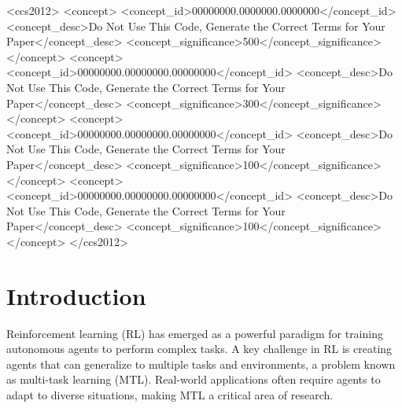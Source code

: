 \documentclass[sigconf]{acmart}
\begin{document}
\begin{CCSXML}
<ccs2012>
 <concept>
  <concept_id>00000000.0000000.0000000</concept_id>
  <concept_desc>Do Not Use This Code, Generate the Correct Terms for Your Paper</concept_desc>
  <concept_significance>500</concept_significance>
 </concept>
 <concept>
  <concept_id>00000000.00000000.00000000</concept_id>
  <concept_desc>Do Not Use This Code, Generate the Correct Terms for Your Paper</concept_desc>
  <concept_significance>300</concept_significance>
 </concept>
 <concept>
  <concept_id>00000000.00000000.00000000</concept_id>
  <concept_desc>Do Not Use This Code, Generate the Correct Terms for Your Paper</concept_desc>
  <concept_significance>100</concept_significance>
 </concept>
 <concept>
  <concept_id>00000000.00000000.00000000</concept_id>
  <concept_desc>Do Not Use This Code, Generate the Correct Terms for Your Paper</concept_desc>
  <concept_significance>100</concept_significance>
 </concept>
</ccs2012>
\end{CCSXML}




\maketitle

\section{Introduction}
Reinforcement learning (RL) has emerged as a powerful paradigm for 
training autonomous agents to perform complex tasks. A key challenge 
in RL is creating agents that can generalize to multiple tasks and 
environments, a problem known as multi-task learning (MTL). Real-world 
applications often require agents to adapt to diverse situations, 
making MTL a critical area of research.
\end{document}
